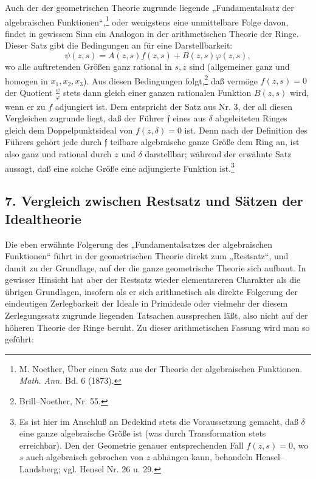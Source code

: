 \documentclass[11pt]{article}
\providecommand{\frf}{\mathfrak f}
\begin{document}
Auch der der geometrischen Theorie zugrunde liegende „Fundamentalsatz der algebraischen Funktionen“,\footnote{M. Noether, Über einen Satz aus der Theorie der algebraischen Funktionen. \emph{Math. Ann.} Bd. 6 (1873).} oder wenigstens eine unmittelbare Folge davon, findet in gewissem Sinn ein Analogon in der arithmetischen Theorie der Ringe. Dieser Satz gibt die Bedingungen an für eine Darstellbarkeit:
\[
\psi(z,s)=A(z,s)f(z,s)+B(z,s)\varphi(z,s),
\]
wo alle auftretenden Größen ganz rational in \(s,z\) sind (allgemeiner ganz und homogen in \(x_1,x_2,x_3\)). Aus diesen Bedingungen folgt,\footnote{Brill--Noether, Nr. 55.} daß vermöge \(f(z,s)=0\) der Quotient \(\frac{\psi}{\varphi}\) stets dann gleich einer ganzen rationalen Funktion \(B(z,s)\) wird, wenn er zu \(f\) adjungiert ist. Dem entspricht der Satz aus Nr. 3, der all diesen Vergleichen zugrunde liegt, daß der Führer \(\frf\) eines aus \(\delta\) abgeleiteten Ringes gleich dem Doppelpunktsideal von \(f(z,\delta)=0\) ist. Denn nach der Definition des Führers gehört jede durch \(\frf\) teilbare algebraische ganze Größe dem Ring an, ist also ganz und rational durch \(z\) und \(\delta\) darstellbar; während der erwähnte Satz aussagt, daß eine solche Größe eine adjungierte Funktion ist.\footnote{Es ist hier im Anschluß an Dedekind stets die Voraussetzung gemacht, daß \(\delta\) eine ganze algebraische Größe ist (was durch Transformation stets erreichbar). Den der Geometrie genauer entsprechenden Fall \(f(z,s)=0\), wo \(s\) auch algebraisch gebrochen von \(z\) abhängen kann, behandeln Hensel--Landsberg; vgl. Hensel Nr. 26 u. 29.}

\subsection*{7. Vergleich zwischen Restsatz und Sätzen der Idealtheorie}
Die eben erwähnte Folgerung des „Fundamentalsatzes der algebraischen Funktionen“ führt in der geometrischen Theorie direkt zum „Restsatz“, und damit zu der Grundlage, auf der die ganze geometrische Theorie sich aufbaut. In gewisser Hinsicht hat aber der Restsatz wieder elementareren Charakter als die übrigen Grundlagen, insofern als er sich arithmetisch als direkte Folgerung der eindeutigen Zerlegbarkeit der Ideale in Primideale oder vielmehr der diesem Zerlegungssatz zugrunde liegenden Tatsachen aussprechen läßt, also nicht auf der höheren Theorie der Ringe beruht. Zu dieser arithmetischen Fassung wird man so geführt:
\end{document}
